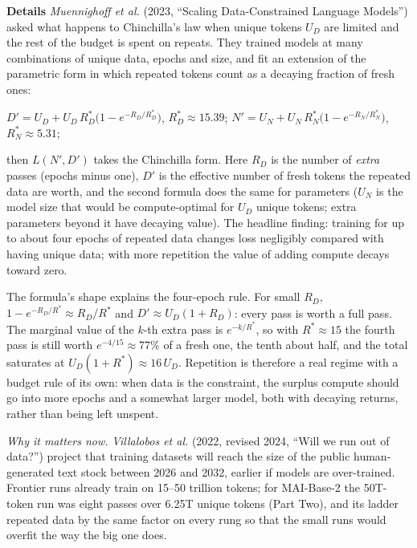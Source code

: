 \documentclass[11pt,letterpaper]{article}
\newcommand{\para}[1]{\medskip\noindent\textbf{#1}\quad}
\newenvironment{formulas}{\begin{tcolorbox}[formulabox]}{\end{tcolorbox}}
\begin{document}
\para{Details} \emph{Muennighoff et al.} (2023, ``Scaling Data-Constrained Language Models'') asked what happens to Chinchilla's law when unique tokens $U_D$ are limited and the rest of the budget is spent on repeats. They trained models at many combinations of unique data, epochs and size, and fit an extension of the parametric form in which repeated tokens count as a decaying fraction of fresh ones:
\begin{formulas}
$D'=U_D+U_D\,R_D^*\big(1-e^{-R_D/R_D^*}\big)$, \quad $R_D^*\approx15.39$; \qquad
$N'=U_N+U_N\,R_N^*\big(1-e^{-R_N/R_N^*}\big)$, \quad $R_N^*\approx5.31$;
\end{formulas}
then $L(N',D')$ takes the Chinchilla form. Here $R_D$ is the number of \emph{extra} passes (epochs minus one), $D'$ is the effective number of fresh tokens the repeated data are worth, and the second formula does the same for parameters ($U_N$ is the model size that would be compute-optimal for $U_D$ unique tokens; extra parameters beyond it have decaying value). The headline finding: training for up to about four epochs of repeated data changes loss negligibly compared with having unique data; with more repetition the value of adding compute decays toward zero.

The formula's shape explains the four-epoch rule. For small $R_D$, $1-e^{-R_D/R^*}\approx R_D/R^*$ and $D'\approx U_D(1+R_D)$: every pass is worth a full pass. The marginal value of the $k$-th extra pass is $e^{-k/R^*}$, so with $R^*\approx15$ the fourth pass is still worth $e^{-4/15}\approx77\%$ of a fresh one, the tenth about half, and the total saturates at $U_D(1+R^*)\approx16\,U_D$. Repetition is therefore a real regime with a budget rule of its own: when data is the constraint, the surplus compute should go into more epochs and a somewhat larger model, both with decaying returns, rather than being left unspent.

\emph{Why it matters now.} \emph{Villalobos et al.} (2022, revised 2024, ``Will we run out of data?'') project that training datasets will reach the size of the public human-generated text stock between 2026 and 2032, earlier if models are over-trained. Frontier runs already train on 15--50 trillion tokens; for MAI-Base-2 the 50T-token run was eight passes over 6.25T unique tokens (Part Two), and its ladder repeated data by the same factor on every rung so that the small runs would overfit the way the big one does.
\end{document}
